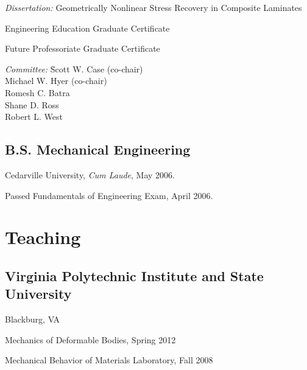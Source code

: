 \documentclass[10pt,letterpaper]{article}
\def\vpisu{Virginia Polytechnic Institute and State University}
\renewenvironment{itemize}{
  \begin{list}{}{
    \setlength{\leftmargin}{30pt}
    \setlength{\itemsep}{0.2em}
    \setlength{\parskip}{0pt}
    \setlength{\parsep}{0.25em}
  }
}{
  \end{list}
}
\begin{document}
\begin{itemize}
\item \textit{Dissertation:} Geometrically Nonlinear Stress Recovery in Composite Laminates
\item Engineering Education Graduate Certificate 
\item Future Professoriate Graduate Certificate
\item
  \begin{tabbing}
    \textit{Committee:} \= Scott W. Case (co-chair) \\
    \> Michael W. Hyer (co-chair) \\
    \> Romesh C. Batra \\
    \> Shane D. Ross \\
    \> Robert L. West
  \end{tabbing}
\end{itemize}

\subsection*{B.S. Mechanical Engineering}
Cedarville University, \textit{Cum Laude}, May 2006.
\begin{itemize}
\item Passed Fundamentals of Engineering Exam, April 2006.
\end{itemize}

\section*{Teaching}

\titleformat{\subsection}[runin]{\large \it}{}{0pt}{}[\hfill\ ]

\subsection*{\vpisu}
Blackburg, VA

\begin{itemize}
\item Mechanics of Deformable Bodies, Spring 2012
\item Mechanical Behavior of Materials Laboratory, Fall 2008
\end{itemize}
\end{document}
